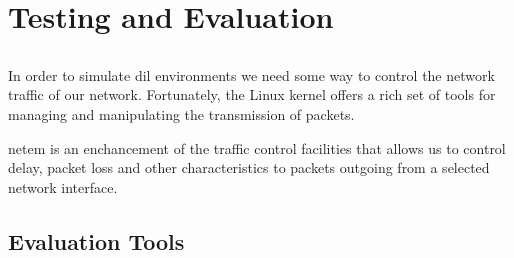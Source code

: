 \chapter{Testing and Evaluation}

\section{}

In order to simulate \gls{dil} environments we need some way to control the
network traffic of our network. Fortunately, the Linux kernel offers a rich set
of tools for managing and manipulating the transmission of packets.

\gls{netem} is an enchancement of the traffic control facilities that allows us
to control delay, packet loss and other characteristics to packets outgoing from
a selected network interface.




\section{Evaluation Tools}
